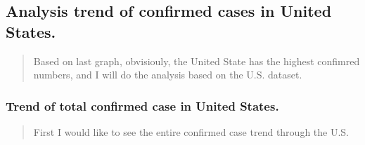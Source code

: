 \documentclass[12pt,]{article}
\newenvironment{Shaded}{\begin{snugshade}}{\end{snugshade}}
\newcommand{\CommentTok}[1]{\textcolor[rgb]{0.56,0.35,0.01}{\textit{#1}}}
\newcommand{\DataTypeTok}[1]{\textcolor[rgb]{0.13,0.29,0.53}{#1}}
\newcommand{\KeywordTok}[1]{\textcolor[rgb]{0.13,0.29,0.53}{\textbf{#1}}}
\newcommand{\NormalTok}[1]{#1}
\newcommand{\OperatorTok}[1]{\textcolor[rgb]{0.81,0.36,0.00}{\textbf{#1}}}
\newcommand{\OtherTok}[1]{\textcolor[rgb]{0.56,0.35,0.01}{#1}}
\newcommand{\StringTok}[1]{\textcolor[rgb]{0.31,0.60,0.02}{#1}}
\begin{document}
\hypertarget{analysis-trend-of-confirmed-cases-in-united-states.}{%
\subsection{Analysis trend of confirmed cases in United
States.}\label{analysis-trend-of-confirmed-cases-in-united-states.}}

\begin{quote}
Based on last graph, obvisiouly, the United State has the highest
confimred numbers, and I will do the analysis based on the U.S. dataset.
\end{quote}

\begin{Shaded}
\end{Shaded}

\hypertarget{trend-of-total-confirmed-case-in-united-states.}{%
\subsubsection{Trend of total confirmed case in United
States.}\label{trend-of-total-confirmed-case-in-united-states.}}

\begin{quote}
First I would like to see the entire confirmed case trend through the
U.S.
\end{quote}

\begin{Shaded}
\end{Shaded}
\end{document}
